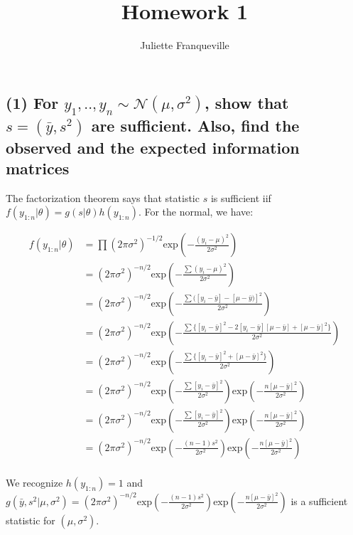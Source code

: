 \documentclass[11pt]{article}
\begin{document}
 
\title{Homework 1}
\author{Juliette Franqueville\\
}
\maketitle

\subsection*{(1)  For $y_1,.., y_n \sim \mathcal{N}(\mu,\sigma^2 )$, show that $s = (\bar{y},s^2 )$ are sufficient. Also, find the observed and the expected information matrices}

The factorization theorem says that statistic $s$ is sufficient iif $f(y_{1:n}|\theta) = g(s|\theta)h(y_{1:n})$. For the normal, we have:

\begin{align*}
   f(y_{1:n}|\theta) &= \prod (2\pi \sigma^2)^{-1/2} \text{exp}\left(-\frac{(y_i-\mu)^2}{2\sigma^2}\right) \\
   &=(2\pi \sigma^2)^{-n/2}\text{exp}\left(-\frac{\sum (y_i-\mu)^2}{2\sigma^2}\right) \\
    &=(2\pi \sigma^2)^{-n/2}\text{exp}\left(-\frac{\sum ([y_i-\bar{y}]-[\mu-\bar{y})]^2}{2\sigma^2}\right) \\
    &=(2\pi \sigma^2)^{-n/2}\text{exp}\left(-\frac{\sum \{ [y_i-\bar{y}]^2-2[y_i-\bar{y}][\mu-\bar{y}]+[\mu-\bar{y}]^2 \}}{2\sigma^2}\right) \\
        &=(2\pi \sigma^2)^{-n/2}\text{exp}\left(-\frac{\sum \{ [y_i-\bar{y}]^2+[\mu-\bar{y}]^2 \}}{2\sigma^2}\right) \\
        &=(2\pi \sigma^2)^{-n/2}\text{exp}\left(-\frac{\sum  [y_i-\bar{y}]^2}{2\sigma^2}\right) \text{exp}\left(-\frac{n [\mu-\bar{y}]^2}{2\sigma^2}\right) \\
        &=(2\pi \sigma^2)^{-n/2}\text{exp}\left(-\frac{\sum  [y_i-\bar{y}]^2}{2\sigma^2}\right) \text{exp}\left(-\frac{n [\mu-\bar{y}]^2}{2\sigma^2}\right) \\
    &=(2\pi \sigma^2)^{-n/2}\text{exp}\left(-\frac{(n-1)s^2}{2\sigma^2}\right) \text{exp}\left(-\frac{n [\mu-\bar{y}]^2}{2\sigma^2}\right) \\
\end{align*}


We recognize $h(y_{1:n}) =1 $ and $g(\bar{y}, s^2|\mu, \sigma^2)= (2\pi \sigma^2)^{-n/2}\text{exp}\left(-\frac{(n-1)s^2}{2\sigma^2}\right) \text{exp}\left(-\frac{n [\mu-\bar{y}]^2}{2\sigma^2}\right)$ is a sufficient statistic for $(\mu, \sigma^2)$.
\end{document}
